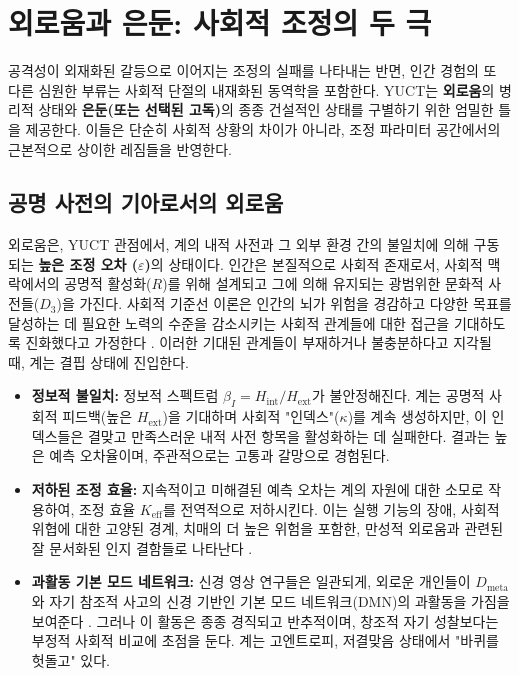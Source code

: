 \documentclass[12pt,a4paper]{article}
\begin{document}
	\section{외로움과 은둔: 사회적 조정의 두 극}
	
	공격성이 외재화된 갈등으로 이어지는 조정의 실패를 나타내는 반면, 인간 경험의 또 다른 심원한 부류는 사회적 단절의 내재화된 동역학을 포함한다. YUCT는 \textbf{외로움}의 병리적 상태와 \textbf{은둔(또는 선택된 고독)}의 종종 건설적인 상태를 구별하기 위한 엄밀한 틀을 제공한다. 이들은 단순히 사회적 상황의 차이가 아니라, 조정 파라미터 공간에서의 근본적으로 상이한 레짐들을 반영한다.
	
	\subsection{공명 사전의 기아로서의 외로움}
	
	외로움은, YUCT 관점에서, 계의 내적 사전과 그 외부 환경 간의 불일치에 의해 구동되는 \textbf{높은 조정 오차 (\(\varepsilon\))}의 상태이다. 인간은 본질적으로 사회적 존재로서, 사회적 맥락에서의 공명적 활성화(\(R\))를 위해 설계되고 그에 의해 유지되는 광범위한 문화적 사전들(\(D_3\))을 가진다. 사회적 기준선 이론은 인간의 뇌가 위험을 경감하고 다양한 목표를 달성하는 데 필요한 노력의 수준을 감소시키는 사회적 관계들에 대한 접근을 기대하도록 진화했다고 가정한다 \cite{Beckes2015}. 이러한 기대된 관계들이 부재하거나 불충분하다고 지각될 때, 계는 결핍 상태에 진입한다.
	
	\begin{itemize}
		\item \textbf{정보적 불일치:} 정보적 스펙트럼 \(\beta_I = H_{\mathrm{int}}/H_{\mathrm{ext}}\)가 불안정해진다. 계는 공명적 사회적 피드백(높은 \(H_{\mathrm{ext}}\))을 기대하며 사회적 "인덱스"(\(\kappa\))를 계속 생성하지만, 이 인덱스들은 결맞고 만족스러운 내적 사전 항목을 활성화하는 데 실패한다. 결과는 높은 예측 오차율이며, 주관적으로는 고통과 갈망으로 경험된다.
		\item \textbf{저하된 조정 효율:} 지속적이고 미해결된 예측 오차는 계의 자원에 대한 소모로 작용하여, 조정 효율 \(K_{\mathrm{eff}}\)를 전역적으로 저하시킨다. 이는 실행 기능의 장애, 사회적 위협에 대한 고양된 경계, 치매의 더 높은 위험을 포함한, 만성적 외로움과 관련된 잘 문서화된 인지 결함들로 나타난다 \cite{Finley2025}.
		\item \textbf{과활동 기본 모드 네트워크:} 신경 영상 연구들은 일관되게, 외로운 개인들이 \(D_{\text{meta}}\)와 자기 참조적 사고의 신경 기반인 기본 모드 네트워크(DMN)의 과활동을 가짐을 보여준다 \cite{Spreng2020}. 그러나 이 활동은 종종 경직되고 반추적이며, 창조적 자기 성찰보다는 부정적 사회적 비교에 초점을 둔다. 계는 고엔트로피, 저결맞음 상태에서 "바퀴를 헛돌고" 있다.
	\end{itemize}
	
\end{document}
